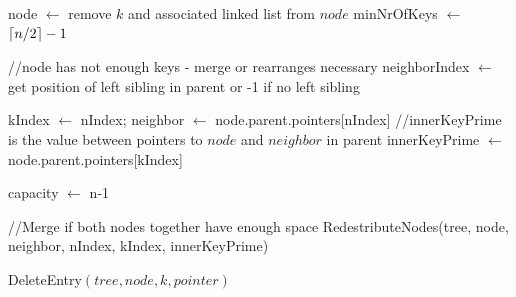 \documentclass[abstracton,12pt,oneside]{scrreprt}
\DeclarePairedDelimiter\ceil{\lceil}{\rceil}
\begin{document}
\begin{algorithm}[H]
	\IncMargin{1em}
	\SetAlgoLined
	\DontPrintSemicolon


		node $\leftarrow$ remove $k$ and associated linked list from $node$\; 
		{
			minNrOfKeys $\leftarrow$ $\ceil{n/2}-1$\;
		}
			
		
		//node has not enough keys - merge or rearranges necessary\; 
		neighborIndex $\leftarrow$ get position of left sibling in parent or -1 if no left sibling\;
		
		{
			kIndex $\leftarrow$ nIndex; \;
			neighbor $\leftarrow$ node.parent.pointers[nIndex]\;
		}
		//innerKeyPrime is the value between pointers to $node$ and $neighbor$ in parent\;
		innerKeyPrime $\leftarrow$ node.parent.pointers[kIndex]
		
		capacity $\leftarrow$ n-1\;	
	

		//Merge if both nodes together have enough space\;
		 {
		  	RedestributeNodes(tree, node, neighbor, nIndex, kIndex, innerKeyPrime)\;
		}   
	
	

	\caption{DeleteEntry$(tree, node, k, pointer)$}	\label{deleteEntry}
\end{algorithm}
\end{document}
